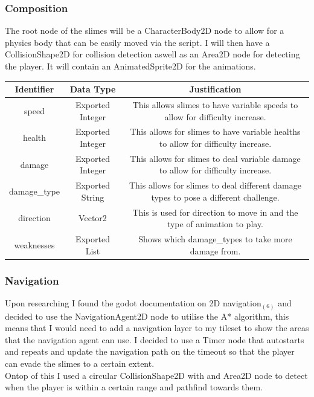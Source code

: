 \documentclass{article}
\begin{document}
        \subsubsection{Composition}
        The root node of the slimes will be a CharacterBody2D node to allow for a physics body that can be easily moved via the script. I will then have a CollisionShape2D for collision detection aswell as an Area2D node for detecting the player. It will contain an AnimatedSprite2D for the animations.\\
        \begin{tabular}{|c|c|c|}
                \hline
                Identifier&Data Type&Justification\\
                \hline
                speed&Exported Integer&This allows slimes to have variable speeds to allow for difficulty increase.\\
                \hline
                health&Exported Integer&This allows for slimes to have variable healths to allow for difficulty increase.\\
                \hline
                damage&Exported Integer&This allows for slimes to deal variable damage to allow for difficulty increase.\\
                \hline
                damage\_type&Exported String&This allows for slimes to deal different damage types to pose a different challenge.\\
                \hline
                direction&Vector2&This is used for direction to move in and the type of animation to play.\\
                \hline
                weaknesses&Exported List&Shows which damage\_types to take more damage from.\\
                \hline
        \end{tabular}
        \subsubsection{Navigation}
        Upon researching I found the godot documentation on 2D navigation$_{(6)}$ and decided to use the NavigationAgent2D node to utilise the A* algorithm, this means that I would need to add a navigation layer to my tileset to show the areas that the navigation agent can use. I decided to use a Timer node that autostarts and repeats and update the navigation path on the timeout so that the player can evade the slimes to a certain extent.\\
        Ontop of this I used a circular CollisionShape2D with and Area2D node to detect when the player is within a certain range and pathfind towards them.\\
\end{document}

